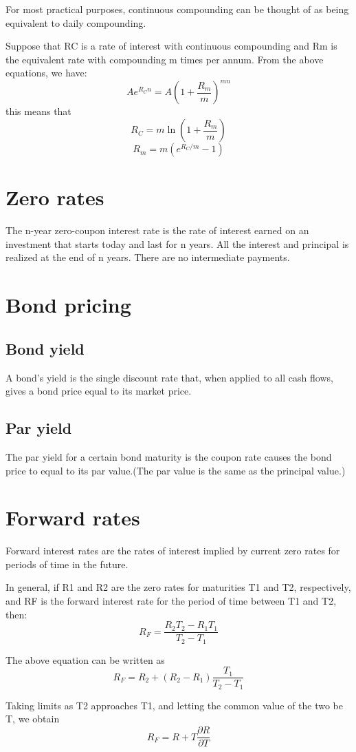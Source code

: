 \documentclass{article}
\begin{document}
For most practical purposes, continuous compounding can be thought of as being equivalent to daily compounding.

Suppose that RC is a rate of interest with continuous compounding and Rm is the equivalent rate with compounding m times per annum. From the above equations, we have:
\[
Ae^{R_Cn}=A(1+\frac{R_m}{m})^{mn}
\]
this means that
\[
R_C=m\ln(1+\frac{R_m}{m})
\]
\[
R_m=m(e^{R_C/m}-1)
\]

\section{Zero rates}
The n-year zero-coupon interest rate is the rate of interest earned on an investment that starts today and last for n years. All the interest and principal is realized at the end of n years. There are no intermediate payments. 

\section{Bond pricing}
\subsection{Bond yield}
A bond's yield is the single discount rate that, when applied to all cash flows, gives a bond price equal to its market price.

\subsection{Par yield}
The par yield for a certain bond maturity is the coupon rate causes the bond price to equal to its par value.(The par value is the same as the principal value.)

\section{Forward rates}
Forward interest rates are the rates of interest implied by current zero rates for periods of time in the future.

In general, if R1 and R2 are the zero rates for maturities T1 and T2, respectively, and RF is the forward interest rate for the period of time between T1 and T2, then:
\[
R_F=\frac{R_2T_2-R_1T_1}{T_2-T_1}
\]

The above equation can be written as
\[
R_F=R_2+(R_2-R_1)\frac{T_1}{T_2-T_1}
\]

Taking limits as T2 approaches T1, and letting the common value of the two be T, we obtain
\[
R_F=R+T\frac{\partial R}{\partial T}
\]
\end{document}
